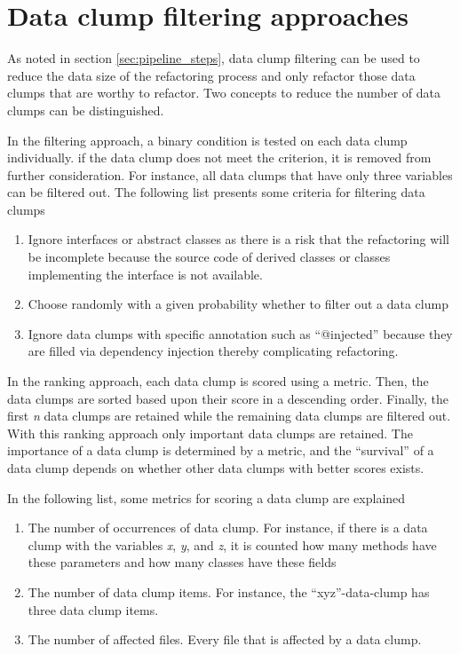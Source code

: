 \section{Data clump filtering approaches}
\label{sec:data_clump_filtering}

As noted in section \ref{sec:pipeline_steps}, data clump filtering can be used to reduce the data size of the refactoring process and only refactor those data clumps that are worthy to refactor. Two concepts to  reduce the number of data clumps can be distinguished.

In the filtering approach, a binary condition is tested on each data clump individually. if the data clump does not meet the criterion, it is removed from further consideration. For instance, all data clumps that have only three variables can be filtered out. 
The following list presents some criteria for filtering data clumps
\begin{enumerate}
    \item Ignore interfaces or abstract classes as there is a risk that the refactoring will be incomplete because the source code of derived classes or classes implementing the interface is not available. 

    \item Choose randomly with a given probability whether to filter out a data clump
    \item Ignore data clumps with specific annotation such as \enquote{@injected} because they are filled via dependency injection thereby complicating refactoring.
 
\end{enumerate}

In the ranking approach, each data clump is scored using a metric. Then, the data clumps are sorted based upon their score in a descending order. Finally, the first  \textit{n} data clumps are retained while the remaining data clumps are filtered out. With this ranking approach only important data clumps are retained. The importance of a data clump is determined by a metric, and the \enquote{survival} of a data clump depends on whether other data clumps with better scores exists.

In the following list, some metrics for scoring a data clump are explained

\begin{enumerate}

    \item The number of occurrences of data clump. For instance, if there is a data clump with the variables \textit{x}, \textit{y}, and  \textit{z}, it is counted how many methods have these parameters and how many classes have these fields

     \item The number of data clump items. For instance, the \enquote{xyz}-data-clump has three data clump items.
     
    \item The number of affected files. Every file that is affected by a data clump. 
    
\end{enumerate}

